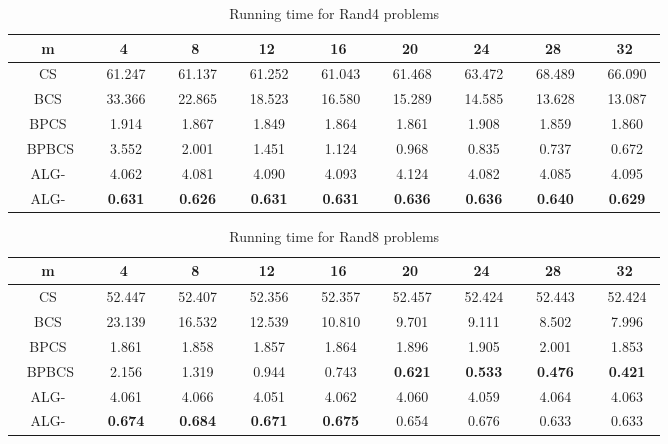 \documentclass{llncs}
\newcommand{\rom}[1]{\uppercase\expandafter{\romannumeral #1\relax}}
\begin{document}
{\begin{table}
\begin{center}
\begin{tabular}{|c|c|c|c|c|c|c|c|c|}
\hline
m&4&8&12&16&20&24&28&32\\
\hline
CS &~ 61.247~ &~ 61.137~ &~ 61.252~ &~ 61.043~ &~ 61.468~ &~ 63.472~ &~ 68.489~ &~ 66.090~ \\
\hline
BCS &~ 33.366~ &~ 22.865~ &~ 18.523~ &~ 16.580~ &~ 15.289~ &~ 14.585~ &~ 13.628~ &~ 13.087~ \\
\hline
BPCS &~ 1.914~ &~ 1.867~ &~ 1.849~ &~ 1.864~ &~ 1.861~ &~ 1.908~ &~ 1.859~ &~ 1.860~ \\
\hline
~ BPBCS~ &~ 3.552~ &~ 2.001~ &~ 1.451~ &~ 1.124~ &~ 0.968~ &~ 0.835~ &~ 0.737~ &~ 0.672~ \\
\hline 
ALG-\rom{2} &~ 4.062~ &~ 4.081~ &~ 4.090~ &~ 4.093~ &~ 4.124~ &~ 4.082~ &~ 4.085~ &~ 4.095~ \\
\hline
ALG-\rom{1} &~ \textbf{0.631}~ &~ \textbf{0.626}~ &~ \textbf{0.631}~ &~ \textbf{0.631}~ &~ \textbf{0.636}~ &~ \textbf{0.636}~ &~ \textbf{0.640}~ &~ \textbf{0.629}~ \\
\hline
\end{tabular}
\caption{Running time for Rand4 problems}
\label{Rand4}
\end{center}
\end{table}

\begin{table}
\begin{center}
\begin{tabular}{|c|c|c|c|c|c|c|c|c|}
\hline
m&4&8&12&16&20&24&28&32\\
\hline
CS &~ 52.447~ &~ 52.407~ &~ 52.356~ &~ 52.357~ &~ 52.457~ &~ 52.424~ &~ 52.443~ &~ 52.424~ \\
\hline
BCS &~ 23.139~ &~ 16.532~ &~ 12.539~ &~ 10.810~ &~ 9.701~ &~ 9.111~ &~ 8.502~ &~ 7.996~ \\
\hline
BPCS &~ 1.861~ &~ 1.858~ &~ 1.857~ &~ 1.864~ &~ 1.896~ &~ 1.905~ &~ 2.001~ &~ 1.853~ \\
\hline
~ BPBCS~ &~ 2.156~ &~ 1.319~ &~ 0.944~ &~ 0.743~ &~ \textbf{0.621}~ &~ \textbf{0.533}~ &~ \textbf{0.476}~ &~ \textbf{0.421}~ \\
\hline 
ALG-\rom{2} &~ 4.061~ &~ 4.066~ &~ 4.051~ &~ 4.062~ &~ 4.060~ &~ 4.059~ &~ 4.064~ &~ 4.063~ \\
\hline
ALG-\rom{1} &~ \textbf{0.674}~ &~ \textbf{0.684}~ &~ \textbf{0.671}~ &~ \textbf{0.675}~ &~ 0.654~ &~ 0.676~ &~ 0.633~ &~ 0.633~ \\
\hline
\end{tabular}
\caption{Running time for Rand8 problems}
\label{Rand8}
\end{center}
\end{table}

}
\end{document}
